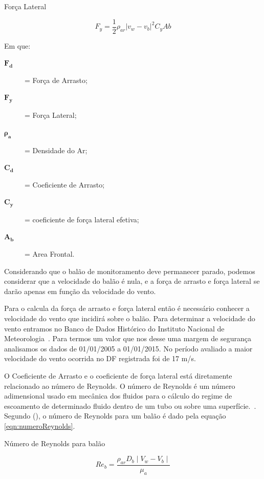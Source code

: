 	\begin{equacao}
	\caption[Força lateral]{Força Lateral~\cite{yajima}}
		\begin{equation}
			F_{y} = \frac{1}{2} \rho_{ar} \left | v_{w} - v_{b} \right |^{2} C_{y}A{b}
		\end{equation}
		\label{eqn:forcaLateral}
	\end{equacao}

	Em que:
	\begin{description}
		\item[$\boldsymbol{F_{d}}$] = Força de Arrasto;
		\item[$\boldsymbol{F_{y}}$] = Força Lateral;
		\item[$\boldsymbol{\rho_{a}}$] = Densidade do Ar;
		\item[$\boldsymbol{C_{d}}$] = Coeficiente de Arrasto;
		\item[$\boldsymbol{C_{y}}$] = coeficiente de força lateral efetiva;
		\item[$\boldsymbol{A_{b}}$] = Area Frontal.
	\end{description}

	Considerando que o balão de monitoramento deve permanecer parado, podemos considerar que a velocidade do balão é nula, e a força de arrasto e força lateral se darão apenas em função da velocidade do vento.

	Para o calcula da força de arrasto e força lateral então é necessário conhecer a velocidade do vento que incidirá sobre o balão. Para determinar a velocidade do vento entramos no Banco de Dados Histórico do Instituto Nacional de Meteorologia~\cite{inmet}. Para termos um valor que nos desse uma margem de segurança analisamos os dados de 01/01/2005 a 01/01/2015. No período avaliado a maior velocidade do vento ocorrida no DF registrada foi de 17 m/s.

	O Coeficiente de Arrasto e o coeficiente de força lateral está diretamente relacionado ao número de Reynolds. O número de Reynolds é um número adimensional usado em mecânica dos fluidos para o cálculo do regime de escoamento de determinado fluido dentro de um tubo ou sobre uma superfície.~\cite{bird}. Segundo  (\citeyear{yajima}), o número de Reynolds para um balão é dado pela equação \eqref{eqn:numeroReynolds}.

	\begin{equacao}
	\caption{Número de Reynolds para balão}
		\begin{equation}
			Re_{b} = \frac{\rho_{ar} D_{b} \mid V_{w} - V_{b} \mid}{\mu_{a}}
		\end{equation}
		\label{eqn:numeroReynolds}
	\end{equacao}

